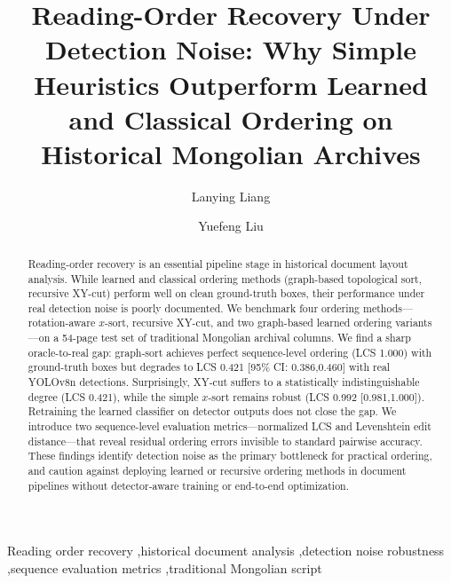 \documentclass[5p,times,twocolumn]{elsarticle}
\begin{document}
\begin{frontmatter}

\title{Reading-Order Recovery Under Detection Noise: Why Simple Heuristics Outperform Learned and Classical Ordering on Historical Mongolian Archives}

\author[1]{Lanying Liang}
\author[2]{Yuefeng Liu}
\address[1]{Archives, Inner Mongolia University of Science and Technology, Baotou, 014010, Inner Mongolia, China}
\address[2]{School of Digital and Intelligent Industry (School of Cyber Science and Technology), Inner Mongolia University of Science and Technology, Baotou, 014010, Inner Mongolia, China}

\begin{abstract}
Reading-order recovery is an essential pipeline stage in historical document layout analysis. While learned and classical ordering methods (graph-based topological sort, recursive XY-cut) perform well on clean ground-truth boxes, their performance under real detection noise is poorly documented. We benchmark four ordering methods---rotation-aware $x$-sort, recursive XY-cut, and two graph-based learned ordering variants---on a 54-page test set of traditional Mongolian archival columns. We find a sharp oracle-to-real gap: graph-sort achieves perfect sequence-level ordering (LCS 1.000) with ground-truth boxes but degrades to LCS 0.421 [95\% CI: 0.386,0.460] with real YOLOv8n detections. Surprisingly, XY-cut suffers to a statistically indistinguishable degree (LCS 0.421), while the simple $x$-sort remains robust (LCS 0.992 [0.981,1.000]). Retraining the learned classifier on detector outputs does not close the gap. We introduce two sequence-level evaluation metrics---normalized LCS and Levenshtein edit distance---that reveal residual ordering errors invisible to standard pairwise accuracy. These findings identify detection noise as the primary bottleneck for practical ordering, and caution against deploying learned or recursive ordering methods in document pipelines without detector-aware training or end-to-end optimization.
\end{abstract}

\begin{keyword}
Reading order recovery \sep historical document analysis \sep detection noise robustness \sep sequence evaluation metrics \sep traditional Mongolian script
\end{keyword}

\end{frontmatter}
\end{document}
